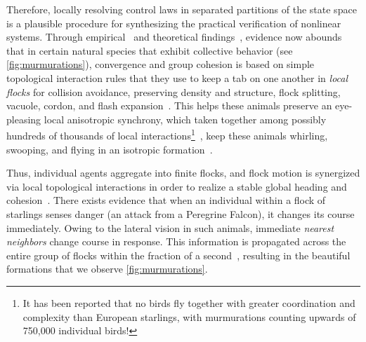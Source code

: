 %
Therefore, locally resolving control laws in separated partitions of the state space is a plausible procedure for synthesizing the practical verification of nonlinear systems. Through empirical~\cite{Ballerini1232, Helbing20, VicsekPhaseNovel} %
and theoretical findings~\cite{JadbabaieCoord}, evidence now abounds that in certain natural species that exhibit collective behavior (see \autoref{fig:murmurations}), convergence and group cohesion is based on simple topological interaction rules that they use to keep a tab on one another in \textit{local flocks} for collision avoidance, preserving density and structure, flock splitting, vacuole, cordon, and flash expansion~\cite{NatGeo}. This helps these animals preserve an eye-pleasing local anisotropic synchrony, which taken together among possibly hundreds of thousands of local interactions\footnote{It has been reported that no birds fly together with greater coordination and complexity than European starlings,  with murmurations counting upwards of 750,000 individual birds!}~\cite{NatGeo}, keep these animals whirling, swooping, and flying in an isotropic formation~\cite{Ballerini1232}. 

Thus, individual agents aggregate into finite flocks, and flock motion is synergized via local topological interactions in order to realize a stable global heading and cohesion~\cite{JadbabaieCoord}. There exists evidence that when an individual within a flock of starlings senses danger (\eg an attack from a Peregrine Falcon), it changes its course immediately. Owing to the lateral vision in such animals, immediate \textit{nearest neighbors} change course in response. This information is propagated across the entire group of flocks within the fraction of a second~\cite{Ballerini1232}, resulting in the beautiful formations that we observe \cf \autoref{fig:murmurations}. 

